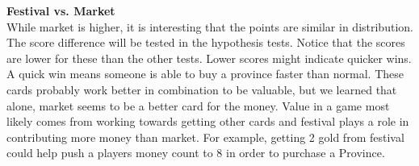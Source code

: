 \documentclass[11pt, oneside]{article}   	%
\begin{document}
\begin{figure}[H]
\begin {minipage}{0.49\textwidth}
   \end{minipage}
\end{figure}

\textbf{Festival vs. Market}\\

While market is higher, it is interesting that the points are similar in distribution. The score difference will be tested in the hypothesis tests. Notice that the scores are lower for these than the other tests. Lower scores might indicate quicker wins. A quick win means someone is able to buy a province faster than normal. These cards probably work better in combination to be valuable, but we learned that alone, market seems to be a better card for the money. Value in a game most likely comes from working towards getting other cards and festival plays a role in contributing more money than market. For example, getting 2 gold from festival could help push a players money count to 8 in order to purchase a Province. 
\\
\end{document}
